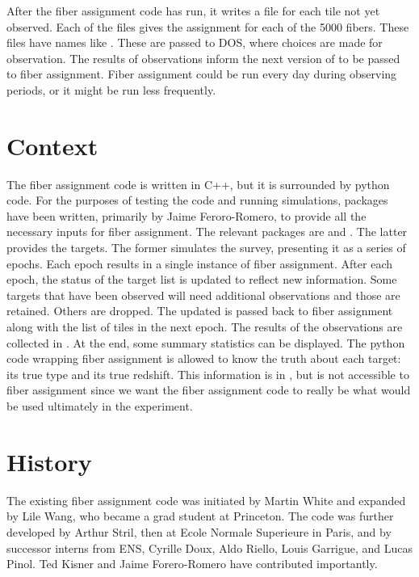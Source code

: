 \documentclass[12pt]{article}
\begin{document}
After the fiber assignment code has run, it writes a file for each tile not yet observed.  Each of the files gives the assignment for each of the 5000 fibers.  These files have names like .  These are passed to DOS, where choices are made for observation.  The results of observations inform the next version of  to be passed to fiber assignment.  Fiber assignment could be run every day during observing periods, or it might be run less frequently.   




\section{Context}

The fiber assignment code is written in C++, but it is surrounded by python code.  For the purposes of testing the code and running simulations, packages have been written, primarily by Jaime Feroro-Romero, to provide all the necessary inputs for fiber assignment.  The relevant packages are  and .  The latter provides the targets.  The former simulates the survey, presenting it as a series of epochs.  Each epoch results in a single instance of fiber assignment.  After each epoch, the status of the target list is updated to reflect new information.  Some targets that have been observed will need additional observations and those are retained. Others are dropped.  The updated  is passed back to fiber assignment along with the list of tiles in the next epoch.  The results of the observations are collected in .  At the end, some summary statistics can be displayed.  The python code wrapping fiber assignment is allowed to know the truth about each target: its true type and its true redshift.  This information is in , but is not accessible to fiber assignment since we want the fiber assignment code to really be what would be used ultimately in the experiment.  

\section{History}
The existing fiber assignment code was initiated by Martin White and expanded by Lile Wang, who became a grad student at Princeton.  The code was further developed by Arthur Stril, then at Ecole Normale Superieure in Paris, and by successor interns from ENS, Cyrille Doux, Aldo Riello, Louis Garrigue, and Lucas Pinol.  Ted Kisner and Jaime Forero-Romero have contributed importantly.
\end{document}
